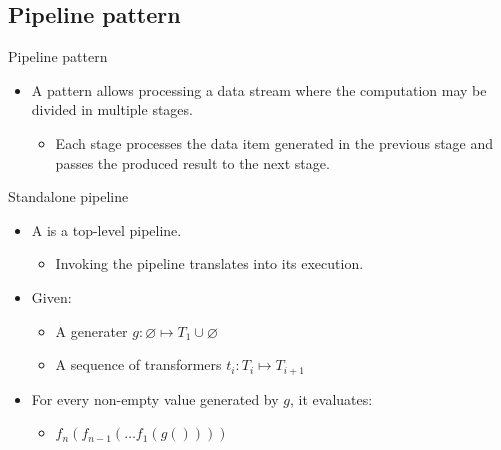 \subsection{Pipeline pattern}

\begin{frame}[t]{Pipeline pattern}
\begin{itemize}
  \item A  pattern allows processing a data stream where the
        computation may be divided in multiple stages.
    \begin{itemize}
      \item Each stage processes the data item generated in the previous stage
            and passes the produced result to the next stage.
    \end{itemize}
\end{itemize}
\end{frame}

\begin{frame}[t]{Standalone pipeline}
\begin{itemize}
  \item A   is a top-level pipeline.
    \begin{itemize}
      \item Invoking the pipeline translates into its execution.
    \end{itemize}

  \vfill\pause
  \item Given:
    \begin{itemize}
      \item A generater $g : \varnothing \mapsto T_1 \cup \varnothing$
      \item A sequence of transformers $t_i : T_i \mapsto T_{i+1}$
    \end{itemize}

  \vfill\pause
  \item For every non-empty value generated by $g$, it evaluates:
    \begin{itemize}
      \item $f_n(f_{n-1}(\ldots f_1(g())))$
    \end{itemize}
\end{itemize}
\end{frame}

